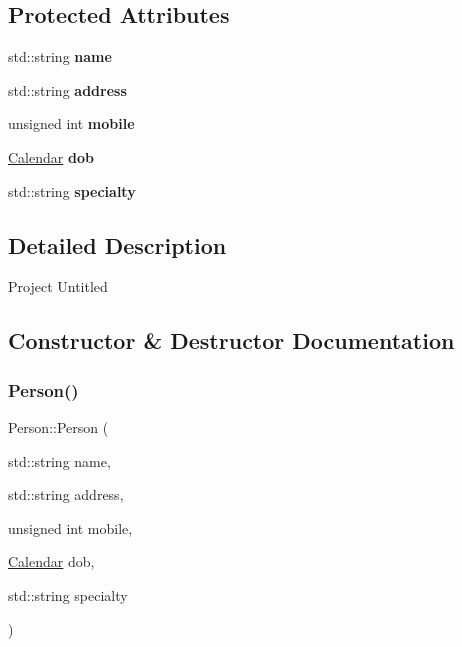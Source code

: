 \subsection*{Protected Attributes}
\begin{DoxyCompactItemize}
\item 
\mbox{\label{class_person_a7594663aadc0de77616506df8a2f4128}} 
std\+::string {\bfseries name}
\item 
\mbox{\label{class_person_a348696c2c3209c6740f7c07d1ff6ebd8}} 
std\+::string {\bfseries address}
\item 
\mbox{\label{class_person_a524573a9dc6aa12b4c6fd2e63bf27352}} 
unsigned int {\bfseries mobile}
\item 
\mbox{\label{class_person_a639e5be834ff0608c09915be31a5514c}} 
\hyperlink{class_calendar}{Calendar} {\bfseries dob}
\item 
\mbox{\label{class_person_a612b37be17477276fec2cf9caaf6aed1}} 
std\+::string {\bfseries specialty}
\end{DoxyCompactItemize}


\subsection{Detailed Description}
Project Untitled 

\subsection{Constructor \& Destructor Documentation}
\mbox{\label{class_person_aebae0cd39e3484b689f903fb08c75b45}} 
\subsubsection{\texorpdfstring{Person()}{Person()}}
{\footnotesize\ttfamily Person\+::\+Person (\begin{DoxyParamCaption}\item[{std\+::string}]{name,  }\item[{std\+::string}]{address,  }\item[{unsigned int}]{mobile,  }\item[{\hyperlink{class_calendar}{Calendar}}]{dob,  }\item[{std\+::string}]{specialty }\end{DoxyParamCaption})}




